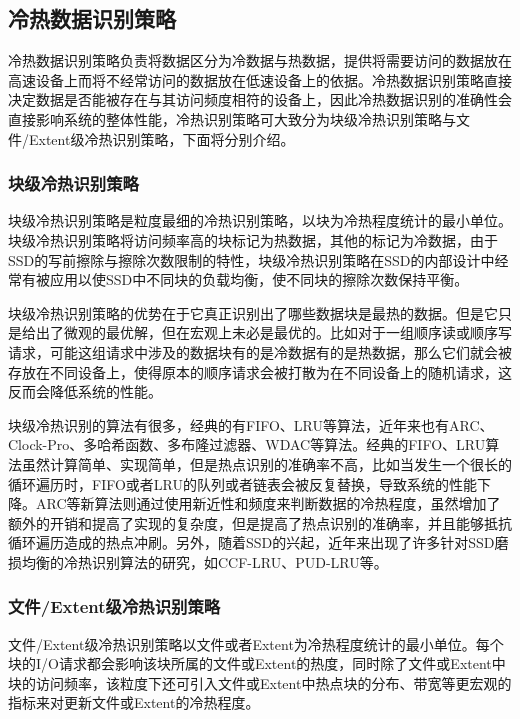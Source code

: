 \subsection{冷热数据识别策略}

冷热数据识别策略负责将数据区分为冷数据与热数据，提供将需要访问的数据放在高速设备上而将不经常访问的数据放在低速设备上的依据。冷热数据识别策略直接决定数据是否能被存在与其访问频度相符的设备上，因此冷热数据识别的准确性会直接影响系统的整体性能，冷热识别策略可大致分为块级冷热识别策略与文件/Extent级冷热识别策略，下面将分别介绍。

\subsubsection{块级冷热识别策略}

块级冷热识别策略是粒度最细的冷热识别策略，以块为冷热程度统计的最小单位。块级冷热识别策略将访问频率高的块标记为热数据，其他的标记为冷数据，由于SSD的写前擦除与擦除次数限制的特性，块级冷热识别策略在SSD的内部设计中经常有被应用以使SSD中不同块的负载均衡，使不同块的擦除次数保持平衡。

块级冷热识别策略的优势在于它真正识别出了哪些数据块是最热的数据。但是它只是给出了微观的最优解，但在宏观上未必是最优的。比如对于一组顺序读或顺序写请求，可能这组请求中涉及的数据块有的是冷数据有的是热数据，那么它们就会被存放在不同设备上，使得原本的顺序请求会被打散为在不同设备上的随机请求，这反而会降低系统的性能。

块级冷热识别的算法有很多，经典的有FIFO、LRU等算法，近年来也有ARC\cite{megiddo2003arc}、Clock-Pro\cite{jiang2005clock}、多哈希函数\cite{hsieh2006efficient}、多布隆过滤器\cite{park2011hot}、WDAC\cite{park2011hot}等算法。经典的FIFO、LRU算法虽然计算简单、实现简单，但是热点识别的准确率不高，比如当发生一个很长的循环遍历时，FIFO或者LRU的队列或者链表会被反复替换，导致系统的性能下降。ARC等新算法则通过使用新近性和频度来判断数据的冷热程度，虽然增加了额外的开销和提高了实现的复杂度，但是提高了热点识别的准确率，并且能够抵抗循环遍历造成的热点冲刷。另外，随着SSD的兴起，近年来出现了许多针对SSD磨损均衡的冷热识别算法的研究，如CCF-LRU\cite{li2009ccf}、PUD-LRU\cite{hu2010pud}等。

\subsubsection{文件/Extent级冷热识别策略}

文件/Extent级冷热识别策略以文件或者Extent为冷热程度统计的最小单位。每个块的I/O请求都会影响该块所属的文件或Extent的热度，同时除了文件或Extent中块的访问频率，该粒度下还可引入文件或Extent中热点块的分布、带宽等更宏观的指标来对更新文件或Extent的冷热程度。

